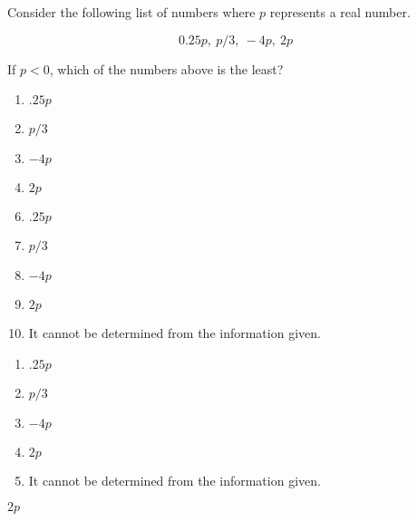 Consider the following list of numbers where $p$ represents a real number.

\[0.25p, \ p/3, \ -4p, \ 2p\]

If $p < 0$, which of the numbers above
is the least?



\ifsat
	\begin{enumerate}[label=\Alph*)]
		\item $.25p$
		\item $p/3$
		\item $-4p$
		\item $2p$%
	\end{enumerate}
\else
\fi

\ifacteven
	\begin{enumerate}[label=\textbf{\Alph*.},itemsep=\fill,align=left]
		\setcounter{enumii}{5}
		\item $.25p$
		\item $p/3$
		\item $-4p$
		\addtocounter{enumii}{1}
		\item $2p$%
		\item It cannot be determined from the information given.
	\end{enumerate}
\else
\fi

\ifactodd
	\begin{enumerate}[label=\textbf{\Alph*.},itemsep=\fill,align=left]
		\item $.25p$
		\item $p/3$
		\item $-4p$
		\item $2p$%
		\item It cannot be determined from the information given.
	\end{enumerate}
\else
\fi

\ifgridin
 $2p$%

\else
\fi

